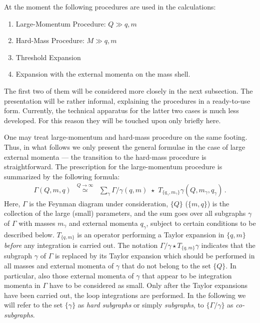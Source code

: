 At the moment the following procedures are used in the calculations:
\renewcommand{\labelenumi}{(\roman{enumi})}
\begin{enumerate}
\item Large-Momentum Procedure: $Q \gg q,m$
\item Hard-Mass Procedure: $M \gg q,m$
\item Threshold Expansion
\item Expansion with the external momenta on the mass shell.
\end{enumerate}
\renewcommand{\labelenumi}{(\Roman{enumi})}
The first two of them will be considered more closely in the next
subsection.  The presentation will be rather informal, explaining the
procedures in a ready-to-use form.  Currently, the technical apparatus
for the latter two cases is much less developed. For this reason they
will be touched upon only briefly here.

One may treat large-momentum and hard-mass procedure on the same
footing. Thus, in what follows we only present the general formulae in
the case of large external momenta --- the transition to the hard-mass
procedure is straightforward.  The prescription for the large-momentum
procedure is summarized by the following formula:
\begin{eqnarray}
\Gamma(Q,m,q) & \stackrel{Q\to \infty}{\simeq} &
\sum_\gamma \Gamma/\gamma(q,m)
\,\,\star\,\, 
T_{\{q_\gamma,m_\gamma\}}\gamma(Q,m_\gamma,q_\gamma)
\,.
\label{eqasexp}
\end{eqnarray}
Here, $\Gamma$ is the Feynman diagram under consideration, $\{Q\}$
($\{m,q\}$) is the collection of the large (small) parameters, and the
sum goes over all subgraphs $\gamma$ of $\Gamma$ with masses $m_\gamma$
and external momenta $q_\gamma$, subject to certain conditions to be
described below.  $T_{\{q,m\}}$ is an operator performing a Taylor
expansion in $\{q,m\}$ {\em before} any integration is carried out.  The
notation $\Gamma/\gamma\star T_{\{q,m\}}\gamma$ indicates that the
subgraph $\gamma$ of $\Gamma$ is replaced by its Taylor expansion which
should be performed in all masses and external momenta of $\gamma$ that
do not belong to the set $\{Q\}$.  In particular, also those external
momenta of $\gamma$ that appear to be integration momenta in $\Gamma$
have to be considered as small. Only after the Taylor expansions have
been carried out, the loop integrations are performed.  In the following
we will refer to the set $\{\gamma\}$ as {\em hard subgraphs} or simply {\em
  subgraphs}, to $\{\Gamma/\gamma\}$ as {\em co-subgraphs}.

